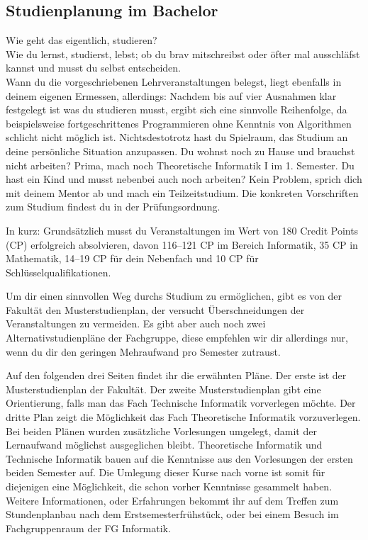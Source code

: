 \subsection{Studienplanung im Bachelor}

Wie geht das eigentlich, studieren?\\
Wie du lernst, studierst, lebst; ob du brav mitschreibst oder öfter mal ausschläfst kannst und musst du selbst entscheiden. \\
Wann du die vorgeschriebenen Lehrveranstaltungen belegst, liegt ebenfalls in deinem eigenen Ermessen, allerdings: Nachdem bis auf vier Ausnahmen klar festgelegt ist was du studieren musst, ergibt sich eine sinnvolle Reihenfolge, da beispielsweise fortgeschrittenes Programmieren ohne Kenntnis von Algorithmen schlicht nicht möglich ist. Nichtsdestotrotz hast du Spielraum, das Studium an deine persönliche Situation anzupassen.
Du wohnst noch zu Hause und brauchst nicht arbeiten? Prima, mach noch Theoretische Informatik I im 1. Semester. Du hast ein Kind und musst nebenbei auch noch arbeiten? Kein Problem, sprich dich mit deinem Mentor ab und mach ein Teilzeitstudium. Die konkreten Vorschriften zum Studium findest du in der Prüfungsordnung.

In kurz: Grundsätzlich musst du Veranstaltungen im Wert von 180 Credit Points (CP) erfolgreich absolvieren, davon 116–121 CP im Bereich Informatik, 35 CP in Mathematik, 14–19 CP für dein Nebenfach und 10 CP für Schlüsselqualifikationen.

Um dir einen sinnvollen Weg durchs Studium zu ermöglichen, gibt es von der Fakultät den Musterstudienplan, der versucht Überschneidungen der Veranstaltungen zu vermeiden. Es gibt aber auch noch zwei Alternativstudienpläne der Fachgruppe, diese empfehlen wir dir allerdings nur, wenn du dir den geringen Mehraufwand pro Semester zutraust.

Auf den folgenden drei Seiten findet ihr die erwähnten Pläne. Der erste ist der Musterstudienplan der Fakultät. Der zweite Musterstudienplan gibt eine Orientierung, falls man das Fach Technische Informatik vorverlegen möchte. Der dritte Plan zeigt die Möglichkeit das Fach Theoretische Informatik vorzuverlegen. Bei beiden Plänen wurden zusätzliche Vorlesungen umgelegt, damit der Lernaufwand möglichst ausgeglichen bleibt. Theoretische Informatik und Technische Informatik bauen auf die Kenntnisse aus den Vorlesungen der ersten beiden Semester auf. Die Umlegung dieser Kurse nach vorne ist somit für diejenigen eine Möglichkeit, die schon vorher Kenntnisse gesammelt haben. Weitere Informationen, oder Erfahrungen bekommt ihr auf dem Treffen zum Stundenplanbau nach dem Erstsemesterfrühstück, oder bei einem Besuch im Fachgruppenraum der FG Informatik.

